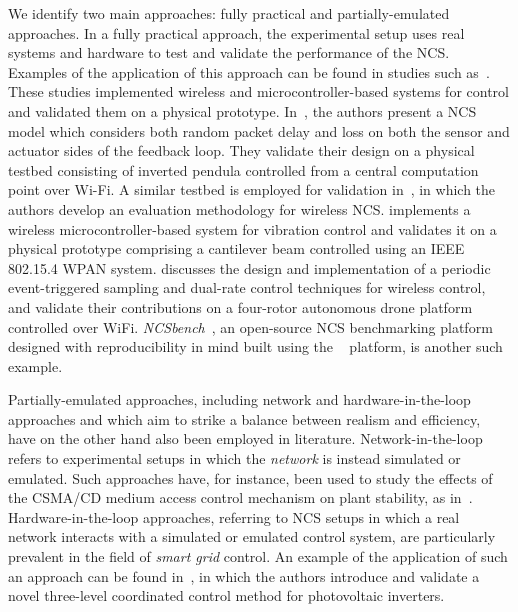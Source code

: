 We identify two main approaches: fully practical and partially-emulated approaches.
In a fully practical approach, the experimental setup uses real systems and hardware to test and validate the performance of the \gls{NCS}.
Examples of the application of this approach can be found in studies such as~\cite{drew2005networked,baumann2018evaluating,li2014wireless,cuenca2019periodic}.
These studies implemented wireless and microcontroller-based systems for control and validated them on a physical prototype.
In~\cite{drew2005networked}, the authors present a \gls{NCS} model which considers both random packet delay and loss on both the sensor and actuator sides of the feedback loop.
They validate their design on a physical testbed consisting of inverted pendula controlled from a central computation point over Wi-Fi.
A similar testbed is employed for validation in~\cite{baumann2018evaluating}, in which the authors develop an evaluation methodology for wireless \gls{NCS}.\@
\cite{li2014wireless} implements a wireless microcontroller-based system for vibration control and validates it on a physical prototype comprising a cantilever beam controlled using an \acs{IEEE} 802.15.4 \gls{WPAN} system.\@ \cite{cuenca2019periodic} discusses the design and implementation of a periodic event-triggered sampling and dual-rate control techniques for wireless control, and validate their contributions on a four-rotor autonomous drone platform controlled over WiFi.
\emph{NCSbench}~\cite{zoppi2020ncsbench}, an open-source \gls{NCS} benchmarking platform designed with reproducibility in mind built using the ~\cite{LEGOMindstormsEV3} platform, is another such example.

Partially-emulated approaches, including network and hardware-in-the-loop approaches and which aim to strike a balance between realism and efficiency, have on the other hand also been employed in literature.
Network-in-the-loop refers to experimental setups in which the \emph{network} is instead simulated or emulated.
Such approaches have, for instance, been used to study the effects of the \gls{CSMA/CD} medium access control mechanism on plant stability, as in~\cite{natale2004inverted}.
Hardware-in-the-loop approaches, referring to \gls{NCS} setups in which a real network interacts with a simulated or emulated control system, are particularly prevalent in the field of \emph{smart grid} control.
An example of the application of such an approach can be found in~\cite{wang2020inverter}, in which the authors introduce and validate a novel three-level coordinated control method for photovoltaic inverters.

